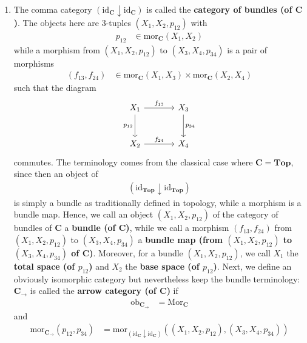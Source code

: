 \begin{enumerate}
\item[(1)]
The comma category $(\mathrm{id}_{\mathbf{C}} \downarrow \mathrm{id}_{\mathbf{C}})$ is called the \textbf{category of bundles (of $\mathbf{C}$)}.
The objects here are $3$-tuples $(X_{1},X_{2},p_{12})$ with
\begin{align*}
  p_{12}
  &\in
  \mathrm{mor}_{\mathbf{C}}(X_{1},X_{2})
\end{align*}
while a morphism from $(X_{1},X_{2},p_{12})$ to $(X_{3},X_{4},p_{34})$ is a pair of morphisms
\begin{align*}
  (f_{13},f_{24})
  &\in
  \mathrm{mor}_{\mathbf{C}}(X_{1},X_{3})
  \times
  \mathrm{mor}_{\mathbf{C}}(X_{2},X_{4})
\end{align*}
such that the diagram
\[
\begin{tikzcd}[sep=large]
  X_{1}
  \arrow{r}{f_{13}}
  \arrow[swap]{d}{p_{12}}
  &
  X_{3}
  \arrow{d}{p_{34}}
  \\
  X_{2}
  \arrow{r}{f_{24}}
  &
  X_{4}
\end{tikzcd}
\]
commutes.
The terminology comes from the classical case where $\mathbf{C} = \mathbf{Top}$, since then an object of
\begin{align*}
  (\mathrm{id}_{\mathbf{Top}} \downarrow \mathrm{id}_{\mathbf{Top}})
\end{align*}
is simply a bundle as traditionally defined in topology, while a morphism is a bundle map.
Hence, we call an object $(X_{1},X_{2},p_{12})$ of the category of bundles of $\mathbf{C}$ a \textbf{bundle (of $\mathbf{C}$)}, while we call a morphism $(f_{13},f_{24})$ from $(X_{1},X_{2},p_{12})$ to $(X_{3},X_{4},p_{34})$ a \textbf{bundle map (from $(X_{1},X_{2},p_{12})$ to $(X_{3},X_{4},p_{34})$ of $\mathbf{C}$)}.
Moreover, for a bundle $(X_{1},X_{2},p_{12})$, we call $X_{1}$ the \textbf{total space (of $p_{12}$)} and $X_{2}$ the \textbf{base space (of $p_{12}$)}.
Next, we define an obviously isomorphic category but nevertheless keep the bundle terminology: $\mathbf{C}_{\rightarrow}$ is called the \textbf{arrow category (of $\mathbf{C}$)} if
\begin{align*}
  \mathrm{ob}_{\mathbf{C}_{\rightarrow}}
  &=
  \mathrm{Mor}_{\mathbf{C}}
\end{align*}
and
\begin{align*}
  \mathrm{mor}_{\mathbf{C}_{\rightarrow}}(p_{12},p_{34})
  &=
  \mathrm{mor}_{(\mathrm{id}_{\mathbf{C}} \downarrow \mathrm{id}_{\mathbf{C}})}
  \left(
    (X_{1},X_{2},p_{12}),
    (X_{3},X_{4},p_{34})
  \right)

\end{align*}
\end{enumerate}
